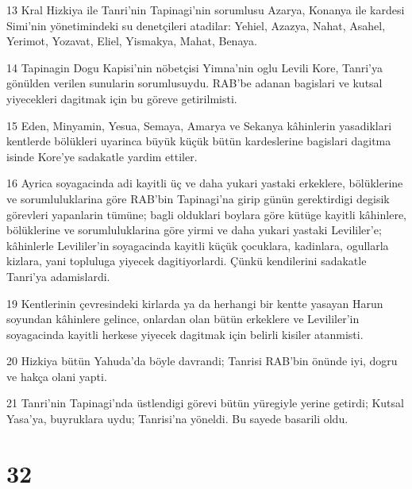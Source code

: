 \par 13 Kral Hizkiya ile Tanri'nin Tapinagi'nin sorumlusu Azarya, Konanya ile kardesi Simi'nin yönetimindeki su denetçileri atadilar: Yehiel, Azazya, Nahat, Asahel, Yerimot, Yozavat, Eliel, Yismakya, Mahat, Benaya.
\par 14 Tapinagin Dogu Kapisi'nin nöbetçisi Yimna'nin oglu Levili Kore, Tanri'ya gönülden verilen sunularin sorumlusuydu. RAB'be adanan bagislari ve kutsal yiyecekleri dagitmak için bu göreve getirilmisti.
\par 15 Eden, Minyamin, Yesua, Semaya, Amarya ve Sekanya kâhinlerin yasadiklari kentlerde bölükleri uyarinca büyük küçük bütün kardeslerine bagislari dagitma isinde Kore'ye sadakatle yardim ettiler.
\par 16 Ayrica soyagacinda adi kayitli üç ve daha yukari yastaki erkeklere, bölüklerine ve sorumluluklarina göre RAB'bin Tapinagi'na girip günün gerektirdigi degisik görevleri yapanlarin tümüne; bagli olduklari boylara göre kütüge kayitli kâhinlere, bölüklerine ve sorumluluklarina göre yirmi ve daha yukari yastaki Levililer'e; kâhinlerle Levililer'in soyagacinda kayitli küçük çocuklara, kadinlara, ogullarla kizlara, yani topluluga yiyecek dagitiyorlardi. Çünkü kendilerini sadakatle Tanri'ya adamislardi.
\par 19 Kentlerinin çevresindeki kirlarda ya da herhangi bir kentte yasayan Harun soyundan kâhinlere gelince, onlardan olan bütün erkeklere ve Levililer'in soyagacinda kayitli herkese yiyecek dagitmak için belirli kisiler atanmisti.
\par 20 Hizkiya bütün Yahuda'da böyle davrandi; Tanrisi RAB'bin önünde iyi, dogru ve hakça olani yapti.
\par 21 Tanri'nin Tapinagi'nda üstlendigi görevi bütün yüregiyle yerine getirdi; Kutsal Yasa'ya, buyruklara uydu; Tanrisi'na yöneldi. Bu sayede basarili oldu.

\chapter{32}

